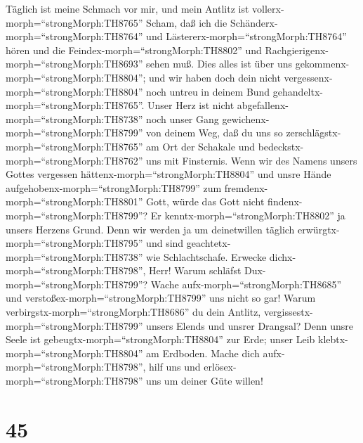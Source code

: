  Täglich ist meine Schmach vor mir, und mein Antlitz ist
vollerx-morph=``strongMorph:TH8765'' Scham,  daß ich die
Schänderx-morph=``strongMorph:TH8764'' und
Lästererx-morph=``strongMorph:TH8764'' hören und die
Feindex-morph=``strongMorph:TH8802'' und
Rachgierigenx-morph=``strongMorph:TH8693'' sehen muß.  Dies
alles ist über uns gekommenx-morph=``strongMorph:TH8804''; und wir haben
doch dein nicht vergessenx-morph=``strongMorph:TH8804'' noch untreu in
deinem Bund gehandeltx-morph=``strongMorph:TH8765''.  Unser
Herz ist nicht abgefallenx-morph=``strongMorph:TH8738'' noch unser Gang
gewichenx-morph=``strongMorph:TH8799'' von deinem Weg,  daß
du uns so zerschlägstx-morph=``strongMorph:TH8765'' am Ort der Schakale
und bedeckstx-morph=``strongMorph:TH8762'' uns mit Finsternis.
 Wenn wir des Namens unsers Gottes vergessen
hättenx-morph=``strongMorph:TH8804'' und unsre Hände
aufgehobenx-morph=``strongMorph:TH8799'' zum
fremdenx-morph=``strongMorph:TH8801'' Gott,  würde das Gott
nicht findenx-morph=``strongMorph:TH8799''? Er
kenntx-morph=``strongMorph:TH8802'' ja unsers Herzens Grund.
 Denn wir werden ja um deinetwillen täglich
erwürgtx-morph=``strongMorph:TH8795'' und sind
geachtetx-morph=``strongMorph:TH8738'' wie Schlachtschafe. 
Erwecke dichx-morph=``strongMorph:TH8798'', Herr! Warum schläfst
Dux-morph=``strongMorph:TH8799''? Wache
aufx-morph=``strongMorph:TH8685'' und
verstoßex-morph=``strongMorph:TH8799'' uns nicht so gar! 
Warum verbirgstx-morph=``strongMorph:TH8686'' du dein Antlitz,
vergissestx-morph=``strongMorph:TH8799'' unsers Elends und unsrer
Drangsal?  Denn unsre Seele ist
gebeugtx-morph=``strongMorph:TH8804'' zur Erde; unser Leib
klebtx-morph=``strongMorph:TH8804'' am Erdboden.  Mache
dich aufx-morph=``strongMorph:TH8798'', hilf uns und
erlösex-morph=``strongMorph:TH8798'' uns um deiner Güte willen!

\hypertarget{section-44}{%
\section{45}\label{section-44}}

